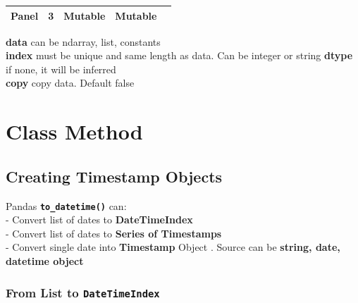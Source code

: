 \documentclass[
]{book}
\begin{document}
\begin{longtable}[]{@{}lllll@{}}
\begin{minipage}[t]{0.10\columnwidth}\raggedright
Panel\strut
\end{minipage} & \begin{minipage}[t]{0.10\columnwidth}\raggedright
3\strut
\end{minipage} & \begin{minipage}[t]{0.10\columnwidth}\raggedright
Mutable\strut
\end{minipage} & \begin{minipage}[t]{0.08\columnwidth}\raggedright
Mutable\strut
\end{minipage} & \begin{minipage}[t]{0.48\columnwidth}\raggedright
\strut
\end{minipage}\tabularnewline
\bottomrule
\end{longtable}

\textbf{data} can be ndarray, list, constants\\
\textbf{index} must be unique and same length as data. Can be integer or string \textbf{dtype} if none, it will be inferred\\
\textbf{copy} copy data. Default false

\hypertarget{class-method-4}{%
\section{Class Method}\label{class-method-4}}

\hypertarget{creating-timestamp-objects}{%
\subsection{Creating Timestamp Objects}\label{creating-timestamp-objects}}

Pandas \textbf{\texttt{to\_datetime()}} can:\\
- Convert list of dates to \textbf{DateTimeIndex}\\
- Convert list of dates to \textbf{Series of Timestamps}\\
- Convert single date into \textbf{Timestamp} Object . Source can be \textbf{string, date, datetime object}

\hypertarget{from-list-to-datetimeindex}{%
\subsubsection{\texorpdfstring{From List to \texttt{DateTimeIndex}}{From List to DateTimeIndex}}\label{from-list-to-datetimeindex}}
\end{document}
